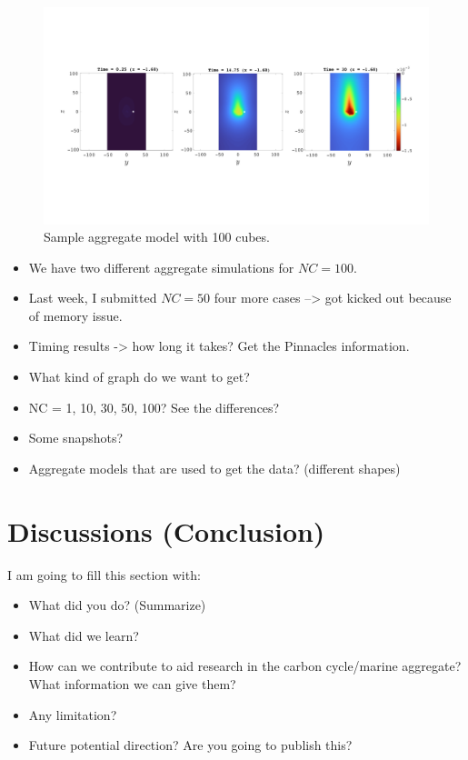 \begin{figure}[ht]
	\begin{center}
		\includegraphics[scale=0.23]{./figures/fig_NC100_snaps_all.pdf}
	\caption{Sample aggregate model with 100 cubes.}
	\label{fig_NC100_snaps_all}
\end{center}
\end{figure}
\begin{itemize}

	\item We have two different aggregate simulations for $NC = 100$.
	\item Last week, I submitted $NC = 50$ four more cases --> got kicked out because of memory issue. 
	\item Timing results -> how long it takes? Get the Pinnacles information.
	\item What kind of graph do we want to get? 
	\item NC = 1, 10, 30, 50, 100? See the differences? 
	\item Some snapshots? 
	\item Aggregate models that are used to get the data? (different shapes)
\end{itemize}
\section{Discussions (Conclusion)}
I am going to fill this section with:
\begin{itemize}
	\item What did you do? (Summarize)
	\item What did we learn?
	\item How can we contribute to aid research in the carbon cycle/marine aggregate? What information we can give them?
	\item Any limitation?
	\item Future potential direction? Are you going to publish this? 
\end{itemize}

